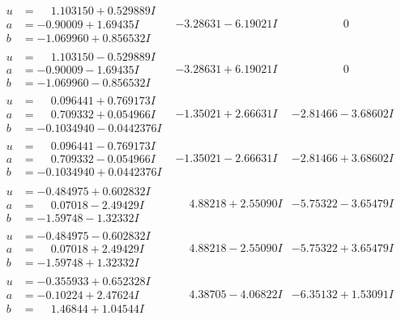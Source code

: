 \documentclass[1p]{elsarticle_modified}
\theoremstyle{definition}
\begin{document}
$$\begin{array}{c|c|c}
\begin{aligned}
u &= \phantom{-}1.103150 + 0.529889 I \\
a &= -0.90009 + 1.69435 I \\
b &= -1.069960 + 0.856532 I\end{aligned}
 & -3.28631 - 6.19021 I & \phantom{-0.000000 } 0 \\ \hline\begin{aligned}
u &= \phantom{-}1.103150 - 0.529889 I \\
a &= -0.90009 - 1.69435 I \\
b &= -1.069960 - 0.856532 I\end{aligned}
 & -3.28631 + 6.19021 I & \phantom{-0.000000 } 0 \\ \hline\begin{aligned}
u &= \phantom{-}0.096441 + 0.769173 I \\
a &= \phantom{-}0.709332 + 0.054966 I \\
b &= -0.1034940 - 0.0442376 I\end{aligned}
 & -1.35021 + 2.66631 I & -2.81466 - 3.68602 I \\ \hline\begin{aligned}
u &= \phantom{-}0.096441 - 0.769173 I \\
a &= \phantom{-}0.709332 - 0.054966 I \\
b &= -0.1034940 + 0.0442376 I\end{aligned}
 & -1.35021 - 2.66631 I & -2.81466 + 3.68602 I \\ \hline\begin{aligned}
u &= -0.484975 + 0.602832 I \\
a &= \phantom{-}0.07018 - 2.49429 I \\
b &= -1.59748 - 1.32332 I\end{aligned}
 & \phantom{-}4.88218 + 2.55090 I & -5.75322 - 3.65479 I \\ \hline\begin{aligned}
u &= -0.484975 - 0.602832 I \\
a &= \phantom{-}0.07018 + 2.49429 I \\
b &= -1.59748 + 1.32332 I\end{aligned}
 & \phantom{-}4.88218 - 2.55090 I & -5.75322 + 3.65479 I \\ \hline\begin{aligned}
u &= -0.355933 + 0.652328 I \\
a &= -0.10224 + 2.47624 I \\
b &= \phantom{-}1.46844 + 1.04544 I\end{aligned}
 & \phantom{-}4.38705 - 4.06822 I & -6.35132 + 1.53091 I \\ \hline\begin{aligned}

\end{aligned}
\end{array}$$
\end{document}
